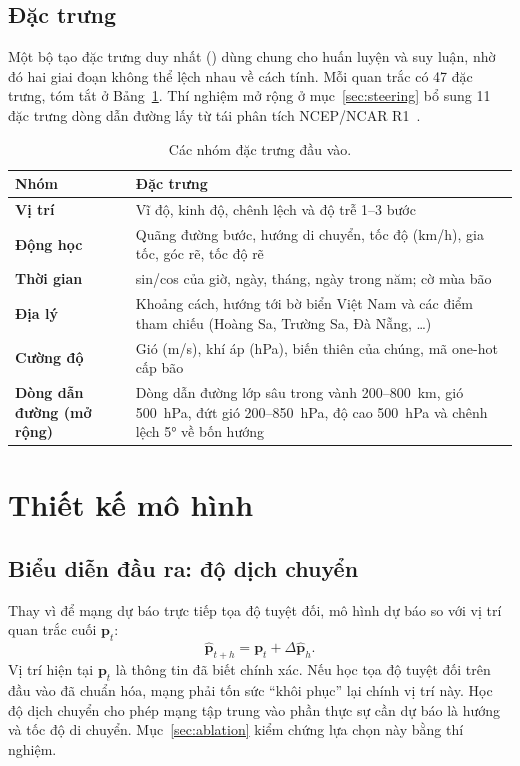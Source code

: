 \subsection{Đặc trưng}

Một bộ tạo đặc trưng duy nhất () dùng chung cho huấn
luyện và suy luận, nhờ đó hai giai đoạn không thể lệch nhau về cách tính. Mỗi
quan trắc có 47 đặc trưng, tóm tắt ở Bảng~\ref{tab:dactrung}. Thí nghiệm mở
rộng ở mục~\ref{sec:steering} bổ sung 11 đặc trưng dòng dẫn đường lấy từ tái
phân tích NCEP/NCAR R1~\cite{Kalnay1996}.

\begin{table}[H]
\centering
\caption{Các nhóm đặc trưng đầu vào.}
\label{tab:dactrung}
\begin{tabularx}{\textwidth}{>{\bfseries\color{daunavy}}l X}
\toprule
\rowcolor{gray100}\bfseries\color{daunavy}Nhóm & \leavevmode\bfseries\color{daunavy}Đặc trưng \\
\midrule
Vị trí     & Vĩ độ, kinh độ, chênh lệch và độ trễ 1--3 bước \\
Động học   & Quãng đường bước, hướng di chuyển, tốc độ (km/h), gia tốc, góc rẽ, tốc độ rẽ \\
Thời gian  & sin/cos của giờ, ngày, tháng, ngày trong năm; cờ mùa bão \\
Địa lý     & Khoảng cách, hướng tới bờ biển Việt Nam và các điểm tham chiếu (Hoàng Sa, Trường Sa, Đà Nẵng, \dots) \\
Cường độ   & Gió (m/s), khí áp (hPa), biến thiên của chúng, mã one-hot cấp bão \\
Dòng dẫn đường (mở rộng) & Dòng dẫn đường lớp sâu trong vành 200--800~km, gió 500~hPa, đứt gió 200--850~hPa, độ cao 500~hPa và chênh lệch 5° về bốn hướng \\
\bottomrule
\end{tabularx}
\end{table}

\section{Thiết kế mô hình}

\subsection{Biểu diễn đầu ra: độ dịch chuyển}

Thay vì để mạng dự báo trực tiếp tọa độ tuyệt đối, mô hình dự báo
 so với vị trí quan trắc cuối $\mathbf{p}_t$:
\begin{equation}
\hat{\mathbf{p}}_{t+h} = \mathbf{p}_t + \Delta\hat{\mathbf{p}}_h .
\end{equation}
Vị trí hiện tại $\mathbf{p}_t$ là thông tin đã biết chính xác. Nếu học tọa độ
tuyệt đối trên đầu vào đã chuẩn hóa, mạng phải tốn sức ``khôi phục'' lại chính
vị trí này. Học độ dịch chuyển cho phép mạng tập trung vào phần thực sự cần
dự báo là hướng và tốc độ di chuyển. Mục~\ref{sec:ablation} kiểm chứng lựa
chọn này bằng thí nghiệm.

